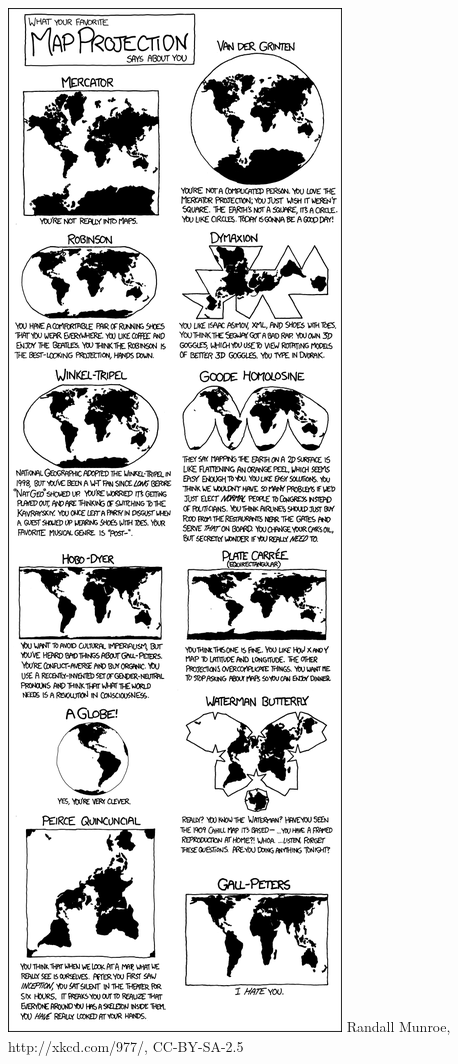 \begin{minipage}[t]{85mm}
\vspace{3mm}
\includegraphics[width=\linewidth]{map_projections.png}
\tiny Randall Munroe, http://xkcd.com/977/, CC-BY-SA-2.5

\end{minipage}


